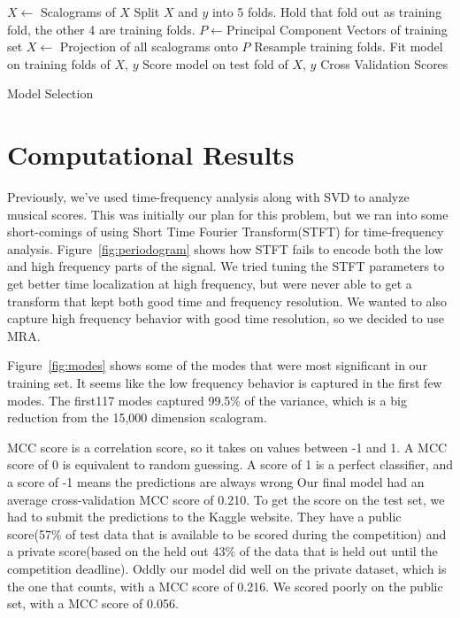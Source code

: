 \documentclass{article}
\begin{document}
\begin{algorithm}
    \begin{algorithmic}
        \STATE $X \leftarrow$ Scalograms of $X$
        \STATE Split $X$ and $y$ into 5 folds.
            \STATE Hold that fold out as training fold, the other 4 are training folds.
            \STATE $P \leftarrow$Principal Component Vectors of training
            set
            \STATE $X \leftarrow$ Projection of all scalograms onto $P$
            \STATE Resample training folds.
            \STATE Fit model on training folds of $X$, $y$
            \STATE Score model on test fold of $X$, $y$
        \ENDFOR
        \RETURN Cross Validation Scores
    \end{algorithmic}
    \caption{Model Selection}
    \label{alg:crossval}
\end{algorithm}


\section{Computational Results}
Previously, we've used time-frequency analysis along with SVD to analyze musical
scores\cite{hw4b}. This was initially our plan for this problem, but we ran into
some short-comings of using Short Time Fourier Transform(STFT) for
time-frequency analysis. Figure~\ref{fig:periodogram} shows how STFT fails to
encode both the low and high frequency parts of the signal. We tried tuning the
STFT parameters to get better time localization at high frequency, but were never able to get a transform that
kept both good time and frequency resolution. We wanted to also capture high frequency behavior with good time resolution,
so we decided to use MRA.

Figure~\ref{fig:modes} shows some of the modes that were most significant in our
training set. It seems like the low frequency behavior is captured in the first
few modes. The first117 modes captured 99.5\% of the variance, which is a big
reduction from the 15,000 dimension scalogram.

MCC score is a correlation score, so it takes on values between -1 and 1. A MCC
score of 0 is equivalent to random guessing. A score of 1 is a perfect
classifier, and a score of -1 means the predictions are always wrong
Our final model had an average cross-validation MCC score of 0.210.
To get the score on the test set, we had to submit the predictions to the Kaggle
website. They have a public score(57\% of test data that is available to be
scored during the competition) and a private score(based on the held out 43\% of
the data that is held out until the competition deadline). Oddly our model did
well on the private dataset, which is the one that counts, with a MCC score of
0.216. We scored poorly on the public set, with a MCC score of 0.056.
\end{document}

